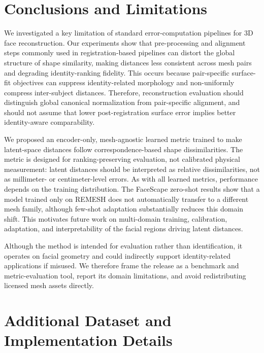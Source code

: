 \documentclass{article}
\begin{document}
\section{Conclusions and Limitations}\label{sec:limitations}
We investigated a key limitation of standard error-computation pipelines for
3D face reconstruction. Our experiments show that pre-processing and alignment
steps commonly used in registration-based pipelines can distort the global
structure of shape similarity, making distances less consistent across mesh
pairs and degrading identity-ranking fidelity. This occurs because pair-specific
surface-fit objectives can suppress identity-related morphology and non-uniformly
compress inter-subject distances. Therefore, reconstruction evaluation should
distinguish global canonical normalization from pair-specific alignment, and
should not assume that lower post-registration surface error implies better
identity-aware comparability.

We proposed an encoder-only, mesh-agnostic learned metric trained to make
latent-space distances follow correspondence-based shape dissimilarities. The
metric is designed for ranking-preserving evaluation, not calibrated physical
measurement: latent distances should be interpreted as relative dissimilarities,
not as millimeter- or centimeter-level errors. As with all learned metrics,
performance depends on the training distribution. The FaceScape zero-shot results
show that a model trained only on REMESH does not automatically transfer to a
different mesh family, although few-shot adaptation substantially reduces this
domain shift. This motivates future work on multi-domain training, calibration,
adaptation, and interpretability of the facial regions driving latent distances.

Although the method is intended for evaluation rather than identification, it
operates on facial geometry and could indirectly support identity-related
applications if misused. We therefore frame the release as a benchmark and
metric-evaluation tool, report its domain limitations, and avoid redistributing
licensed mesh assets directly.
{\small


}

\appendix

\section{Additional Dataset and Implementation Details}
\label{app:implementation_details}
\end{document}
